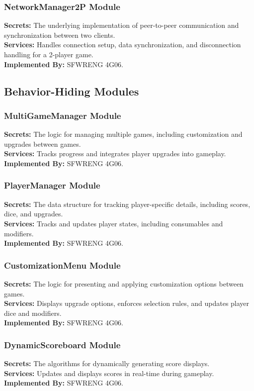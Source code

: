 \documentclass[12pt, titlepage]{article}
\begin{document}
\subsubsection{NetworkManager2P Module}
\textbf{Secrets:} The underlying implementation of peer-to-peer communication and synchronization between two clients.\\
\textbf{Services:} Handles connection setup, data synchronization, and disconnection handling for a 2-player game.\\
\textbf{Implemented By:} SFWRENG 4G06.

\subsection{Behavior-Hiding Modules}
\subsubsection{MultiGameManager Module}
\textbf{Secrets:} The logic for managing multiple games, including customization and upgrades between games.\\
\textbf{Services:} Tracks progress and integrates player upgrades into gameplay.\\
\textbf{Implemented By:} SFWRENG 4G06.

\subsubsection{PlayerManager Module}
\textbf{Secrets:} The data structure for tracking player-specific details, including scores, dice, and upgrades.\\
\textbf{Services:} Tracks and updates player states, including consumables and modifiers.\\
\textbf{Implemented By:} SFWRENG 4G06.

\subsubsection{CustomizationMenu Module}
\textbf{Secrets:} The logic for presenting and applying customization options between games.\\
\textbf{Services:} Displays upgrade options, enforces selection rules, and updates player dice and modifiers.\\
\textbf{Implemented By:} SFWRENG 4G06.

\subsubsection{DynamicScoreboard Module}
\textbf{Secrets:} The algorithms for dynamically generating score displays.\\
\textbf{Services:} Updates and displays scores in real-time during gameplay.\\
\textbf{Implemented By:} SFWRENG 4G06.
\end{document}
